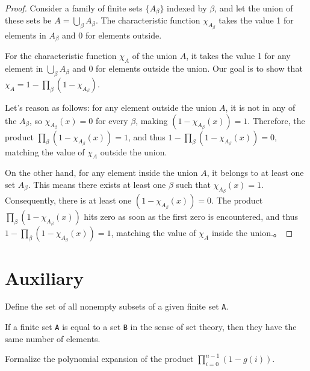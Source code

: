 \begin{proof}
    \leanok

Consider a family of finite sets \(\{A_\beta\}\) indexed by \(\beta\), and let the union of these sets be \(A = \bigcup_\beta A_\beta\). The characteristic function \(\chi_{A_\beta}\) takes the value 1 for elements in \(A_\beta\) and 0 for elements outside.

For the characteristic function \(\chi_A\) of the union \(A\), it takes the value 1 for any element in \(\bigcup_\beta A_\beta\) and 0 for elements outside the union. Our goal is to show that \(\chi_A = 1 - \prod_\beta (1 - \chi_{A_\beta})\).

Let's reason as follows: for any element outside the union \(A\), it is not in any of the \(A_\beta\), so \(\chi_{A_\beta}(x) = 0\) for every \(\beta\), making \((1 - \chi_{A_\beta}(x)) = 1\). Therefore, the product \(\prod_\beta (1 - \chi_{A_\beta}(x)) = 1\), and thus \(1 - \prod_\beta (1 - \chi_{A_\beta}(x)) = 0\), matching the value of \(\chi_A\) outside the union.

On the other hand, for any element inside the union \(A\), it belongs to at least one set \(A_\beta\). This means there exists at least one \(\beta\) such that \(\chi_{A_\beta}(x) = 1\). Consequently, there is at least one \((1 - \chi_{A_\beta}(x)) = 0\). The product \(\prod_\beta (1 - \chi_{A_\beta}(x))\) hits zero as soon as the first zero is encountered, and thus \(1 - \prod_\beta (1 - \chi_{A_\beta}(x)) = 1\), matching the value of \(\chi_A\) inside the union.。

\end{proof}

\section{Auxiliary}

\begin{definition}\label{Finset.powerset₀}
  \leanok
  Define the set of all nonempty subsets of a given finite set \verb|A|.
\end{definition}

\begin{lemma}\label{card_eq}
  \leanok
  If a finite set \verb|A| is equal to a set \verb|B| in the sense of set theory, then they have the same number of elements.
\end{lemma}

\begin{lemma}\label{mul_expand₃}
  \leanok
  Formalize the polynomial expansion of the product \(\prod_{i=0}^{n-1} (1 - g(i))\).
\end{lemma}

